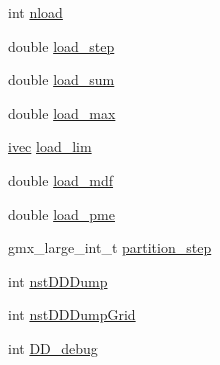 \begin{DoxyCompactItemize}
int \hyperlink{structgmx__domdec__comm_af66f100b729f6e2fb4789440ddf88c1a}{nload}
\item 
double \hyperlink{structgmx__domdec__comm_a58fc2a8177ee78b4b26e1b6140aae932}{load\-\_\-step}
\item 
double \hyperlink{structgmx__domdec__comm_a12f28b9c4e89d3a748b5db4e324baa94}{load\-\_\-sum}
\item 
double \hyperlink{structgmx__domdec__comm_a9f376edf3bef1e9d60097bd8d6ab925d}{load\-\_\-max}
\item 
\hyperlink{share_2template_2gromacs_2types_2simple_8h_a74f6ffdb4a9c1764f5293969d8c681b6}{ivec} \hyperlink{structgmx__domdec__comm_ae1c6f417bf07582b07f2ed5ee4b1bf71}{load\-\_\-lim}
\item 
double \hyperlink{structgmx__domdec__comm_aab0a3d47c404098e5d045e3d9e51dc60}{load\-\_\-mdf}
\item 
double \hyperlink{structgmx__domdec__comm_a7b573b200d8e88fcf862a2211f18bc6f}{load\-\_\-pme}
\item 
gmx\-\_\-large\-\_\-int\-\_\-t \hyperlink{structgmx__domdec__comm_af6a01a6b16591d0bcdd940b7374fdbc1}{partition\-\_\-step}
\item 
int \hyperlink{structgmx__domdec__comm_aacf777924374c758f404263b9d52862a}{nst\-D\-D\-Dump}
\item 
int \hyperlink{structgmx__domdec__comm_ae692b53ea0966bbe8ea64f2c167e91b8}{nst\-D\-D\-Dump\-Grid}
\item 
int \hyperlink{structgmx__domdec__comm_a5650a6d33352a2d73c0e2995462fc8f0}{\-D\-D\-\_\-debug}
\end{DoxyCompactItemize}


